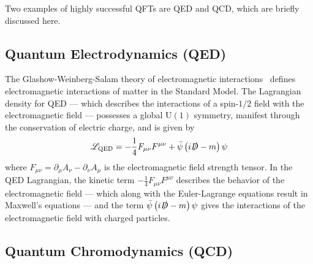 Two examples of highly successful \glspl{QFT} are \gls{QED} and \gls{QCD}, which are briefly discussed here.

\subsection{Quantum Electrodynamics (QED)}\label{subsection:QED}

The Glashow-Weinberg-Salam theory of electromagnetic interactions~\cite{Glashow:1961tr,Goldstone:1962es,Weinberg:1967tq} defines electromagnetic interactions of matter in the Standard Model.
The Lagrangian density for QED --- which describes the interactions of a spin-$1/2$ field with the electromagnetic field --- possesses a global $\mathrm{U}(1)$ symmetry, manifest through the conservation of electric charge, and is given by
\begin{equation}
 \mathscr{L}_{\textrm{QED}} = -\frac{1}{4}F_{\mu\nu} F^{\mu\nu} + \bar{\psi} \left(i \slashed{D} - m\right)\psi
 \label{eq:QED_Lagrangian}
\end{equation}
where $F_{\mu\nu} = \partial_{\mu}A_{\nu} - \partial_{\nu}A_{\mu}$ is the electromagnetic field strength tensor.
In the QED Lagrangian, the kinetic term $-\frac{1}{4}F_{\mu\nu} F^{\mu\nu}$ describes the behavior of the electromagnetic field --- which along with the Euler-Lagrange equations result in Maxwell's equations --- and the term $\bar{\psi} \left(i \slashed{D} - m\right)\psi$ gives the interactions of the electromagnetic field with charged particles.

\subsection{Quantum Chromodynamics (QCD)}\label{subsection:QCD}


